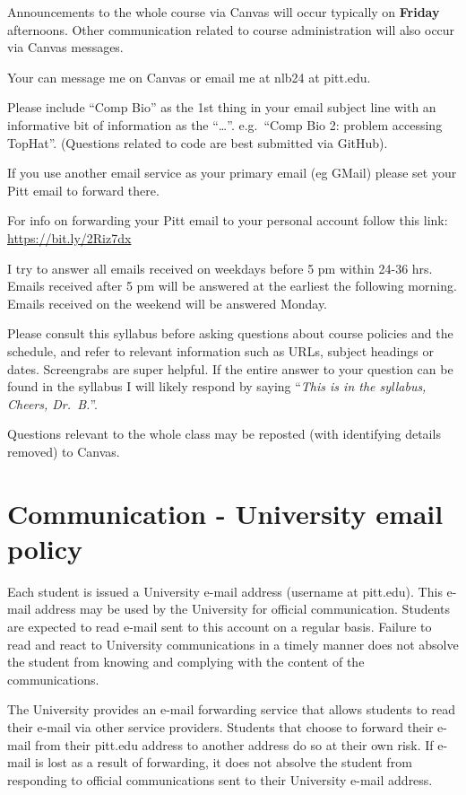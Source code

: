 \documentclass[
]{book}
\begin{document}
Announcements to the whole course via Canvas will occur typically on \textbf{Friday} afternoons. Other communication related to course administration will also occur via Canvas messages.

Your can message me on Canvas or email me at nlb24 at pitt.edu.

Please include ``Comp Bio'' as the 1st thing in your email subject line with an informative bit of information as the ``\ldots{}''. e.g.~``Comp Bio 2: problem accessing TopHat''. (Questions related to code are best submitted via GitHub).

If you use another email service as your primary email (eg GMail) please set your Pitt email to forward there.

For info on forwarding your Pitt email to your personal account follow this link: \url{https://bit.ly/2Riz7dx}

I try to answer all emails received on weekdays before 5 pm within 24-36 hrs. Emails received after 5 pm will be answered at the earliest the following morning. Emails received on the weekend will be answered Monday.

Please consult this syllabus before asking questions about course policies and the schedule, and refer to relevant information such as URLs, subject headings or dates. Screengrabs are super helpful. If the entire answer to your question can be found in the syllabus I will likely respond by saying ``\emph{This is in the syllabus, Cheers, Dr.~B.}''.

Questions relevant to the whole class may be reposted (with identifying details removed) to Canvas.

\hypertarget{communication---university-email-policy}{%
\chapter{Communication - University email policy}\label{communication---university-email-policy}}

Each student is issued a University e-mail address (username at pitt.edu). This e-mail address may be used by the University for official communication. Students are expected to read e-mail sent to this account on a regular basis. Failure to read and react to University communications in a timely manner does not absolve the student from knowing and complying with the content of the communications.

The University provides an e-mail forwarding service that allows students to read their e-mail via other service providers. Students that choose to forward their e-mail from their pitt.edu address to another address do so at their own risk. If e-mail is lost as a result of forwarding, it does not absolve the student from responding to official communications sent to their University e-mail address.
\end{document}
